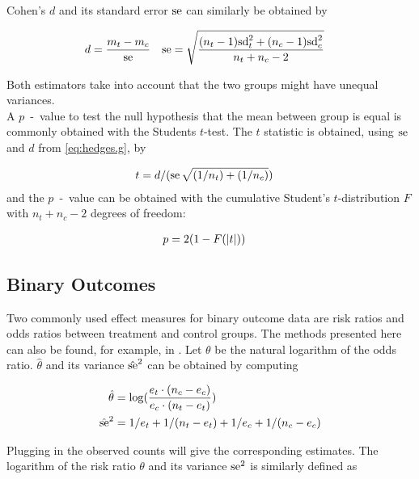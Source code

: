 \documentclass[11pt,a4paper,twoside]{book}\usepackage[]{graphicx}\usepackage[]{color}
\begin{document}
Cohen's $d$ and its standard error $\operatorname{se}$ can similarly be obtained by

\begin{align}
d &= \frac{m_t - m_c}{\operatorname{se}} \label{eq:hedges.g} & \operatorname{se} &= \sqrt{\frac{(n_t - 1)\textrm{sd}_t^2 + (n_c - 1)\textrm{sd}_c^2}{n_t + n_c - 2}}
\end{align}

Both estimators take into account that the two groups might have unequal variances. \\ 
A  $p$\hspace{0.4mm}~-~value to test the null hypothesis that the mean between group is equal is commonly obtained with the Students $t$-test. The $t$ statistic is obtained, using $\operatorname{se}$ and $d$ from \eqref{eq:hedges.g}, by

\begin{align}
t &= d/(\operatorname{se}\sqrt{(1/n_t)+(1/n_c)}) \nonumber
\end{align}
and the  $p$\hspace{0.4mm}~-~value can be obtained with the cumulative Student's $t$-distribution $F$ with $n_t + n_c - 2$ degrees of freedom:

\begin{align}
p &= 2(1-F(\left\lvert t\right\rvert)) \nonumber
\end{align}


\subsection{Binary Outcomes}
Two commonly used effect measures for binary outcome data are risk ratios and odds ratios between treatment and control groups. 
The methods presented here can also be found, for example, in \cite[34]{Intro.meta}.
Let $\theta$ be the natural logarithm of the odds ratio. $\hat{\theta}$ and its variance $\hat{\operatorname{se}}^2$ can be obtained by computing

\begin{align}
\hat{\theta} &= \log(\frac{e_t\cdot(n_c - e_c)}{e_c\cdot(n_t - e_t)}) \nonumber \\
\hat{\operatorname{se}}^2 &= 1/e_t + 1/(n_t - e_t) + 1/e_c + 1/(n_c - e_c) \nonumber
\end{align}

Plugging in the observed counts will give the corresponding estimates. The logarithm of the risk ratio $\theta$ and its variance $\operatorname{se}^2$ is similarly defined as
\end{document}
